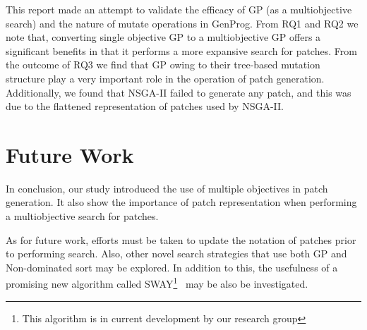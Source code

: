 \documentclass{sig-alternate}
\theoremstyle{break}
\begin{document}
This report made an attempt to validate the efficacy of GP (as a multiobjective search) and the nature of mutate operations in GenProg. From RQ1 and RQ2 we note that, converting single objective GP to a multiobjective GP offers a significant benefits in that it performs a more expansive search for patches. From the outcome of RQ3 we find that GP owing to their tree-based mutation structure play a very important role in the operation of patch generation. Additionally, we found that NSGA-II failed to generate any patch, and this was due to the flattened representation of patches used by NSGA-II.     

\section{Future Work}
\label{conclusions}
In conclusion, our study introduced the use of multiple objectives in patch generation. It also show the importance of patch representation when performing a multiobjective search for patches.

As for future work, efforts must be taken to update the notation of patches prior to performing search. Also, other novel search strategies that use both GP and Non-dominated sort may be explored. In addition to this, the usefulness of a promising new algorithm called SWAY\footnote{This algorithm is in current development by our research group}~\cite{chen2016sampling, nair2016accidental} may be also be investigated.



\end{document}
